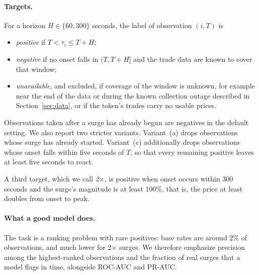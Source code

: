 \paragraph{Targets.}
For a horizon $H \in \{60, 300\}$ seconds, the label of observation $(i, T)$ is
\begin{itemize}
  \item \emph{positive} if $T < \tau_i \le T + H$;
  \item \emph{negative} if no onset falls in $(T, T+H]$ and the trade data are known to cover that window;
  \item \emph{unavailable}, and excluded, if coverage of the window is unknown, for example near the end of the data or during the known collection outage described in Section~\ref{sec:data}, or if the token's trades carry no usable prices.
\end{itemize}
Observations taken after a surge has already begun are negatives in the default setting. We also report two stricter variants. Variant~(a) drops observations whose surge has already started. Variant~(c) additionally drops observations whose onset falls within five seconds of $T$, so that every remaining positive leaves at least five seconds to react.

A third target, which we call \emph{2$\times$}, is positive when onset occurs within 300 seconds and the surge's magnitude is at least 100\%, that is, the price at least doubles from onset to peak.

\paragraph{What a good model does.}
The task is a ranking problem with rare positives: base rates are around 2\% of observations, and much lower for 2$\times$ surges. We therefore emphasize precision among the highest-ranked observations and the fraction of real surges that a model flags in time, alongside ROC-AUC and PR-AUC.
